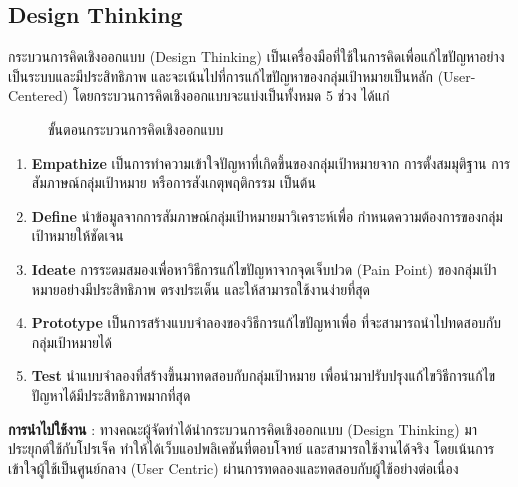 \subsection{Design Thinking}
กระบวนการคิดเชิงออกแบบ (Design Thinking)
เป็นเครื่องมือที่ใช้ในการคิดเพื่อแก้ไขปัญหาอย่างเป็นระบบและมีประสิทธิภาพ
และจะเน้นไปที่การแก้ไขปัญหาของกลุ่มเป้าหมายเป็นหลัก (User-Centered)
โดยกระบวนการคิดเชิงออกแบบจะแบ่งเป็นทั้งหมด 5 ช่วง ได้แก่
\begin{figure}[!h]\centering
      \setlength{\fboxrule}{0.2mm} %
      \setlength{\fboxsep}{0.5cm}
      \caption{ขั้นตอนกระบวนการคิดเชิงออกแบบ}\label{fig:model6}
\end{figure}
\begin{enumerate}
      \item \textbf{Empathize} เป็นการทำความเข้าใจปัญหาที่เกิดขึ้นของกลุ่มเป้าหมายจาก
            การตั้งสมมุติฐาน การสัมภาษณ์กลุ่มเป้าหมาย หรือการสังเกตุพฤติกรรม เป็นต้น
      \item \textbf{Define} นำข้อมูลจากการสัมภาษณ์กลุ่มเป้าหมายมาวิเคราะห์เพื่อ
            กำหนดความต้องการของกลุ่มเป้าหมายให้ชัดเจน
      \item \textbf{Ideate} การระดมสมองเพื่อหาวิธีการแก้ไขปัญหาจากจุดเจ็บปวด
            (Pain Point) ของกลุ่มเป้าหมายอย่างมีประสิทธิภาพ ตรงประเด็น
            และให้สามารถใช้งานง่ายที่สุด
      \item \textbf{Prototype} เป็นการสร้างแบบจำลองของวิธีการแก้ไขปัญหาเพื่อ
            ที่จะสามารถนำไปทดสอบกับกลุ่มเป้าหมายได้
      \item \textbf{Test} นำแบบจำลองที่สร้างขึ้นมาทดสอบกับกลุ่มเป้าหมาย
            เพื่อนำมาปรับปรุงแก้ไขวิธีการแก้ไขปัญหาได้มีประสิทธิภาพมากที่สุด
\end{enumerate}
\textbf{การนำไปใช้งาน} : ทางคณะผู้จัดทำได้นำกระบวนการคิดเชิงออกแบบ
(Design Thinking) มาประยุกต์ใช้กับโปรเจ็ค ทำให้ได้เว็บแอปพลิเคชันที่ตอบโจทย์
และสามารถใช้งานได้จริง โดยเน้นการเข้าใจผู้ใช้เป็นศูนย์กลาง (User Centric)
ผ่านการทดลองและทดสอบกับผู้ใช้อย่างต่อเนื่อง
